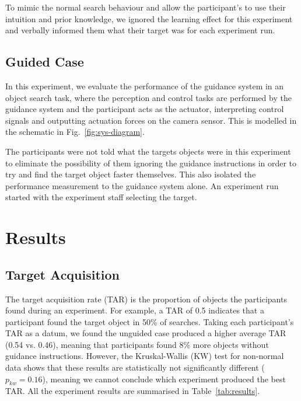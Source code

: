 \documentclass[runningheads]{llncs}
\begin{document}
To mimic the normal search behaviour and allow the participant's to use their intuition and prior knowledge, we ignored the learning effect for this experiment and verbally informed them what their target was for each experiment run.

\subsection{Guided Case}

In this experiment, we evaluate the performance of the guidance system in an object search task, where the perception and control tasks are performed by the guidance system and the participant acts as the actuator, interpreting control signals and outputting actuation forces on the camera sensor. 
This is modelled in the schematic in Fig.~\ref{fig:sys-diagram}. 

The participants were not told what the targets objects were in this experiment to eliminate the possibility of them ignoring the guidance instructions in order to try and find the target object faster themselves.
This also isolated the performance measurement to the guidance system alone.
An experiment run started with the experiment staff selecting the target.

\section{Results}\label{sec:results}

\subsection{Target Acquisition}

The target acquisition rate (TAR) is the proportion of objects the participants found during an experiment. 
For example, a TAR of 0.5 indicates that a participant found the target object in 50\% of searches. 
Taking each participant's TAR as a datum, we found the unguided case produced a higher average TAR (0.54 vs. 0.46), meaning that participants found 8\% more objects without guidance instructions.
However, the Kruskal-Wallis (KW) test for non-normal data shows that these results are statistically not significantly different ($p_{kw} = 0.16$), meaning we cannot conclude which experiment produced the best TAR. 
All the experiment results are summarised in Table~\ref{tab:results}. 
\end{document}
